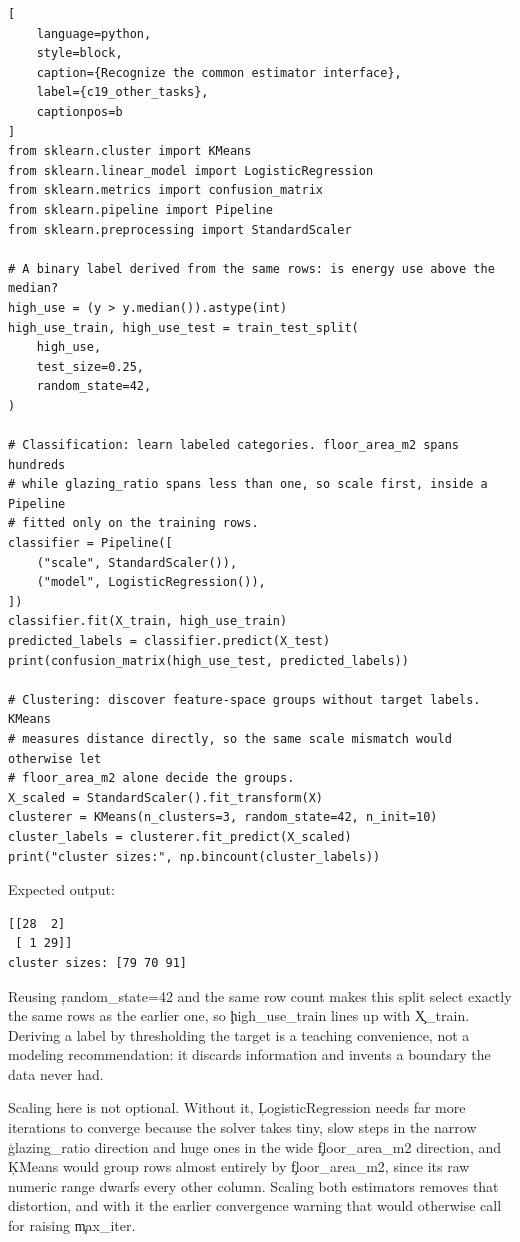 \begin{lstlisting}[
    language=python,
    style=block,
    caption={Recognize the common estimator interface},
    label={c19_other_tasks},
    captionpos=b
]
from sklearn.cluster import KMeans
from sklearn.linear_model import LogisticRegression
from sklearn.metrics import confusion_matrix
from sklearn.pipeline import Pipeline
from sklearn.preprocessing import StandardScaler

# A binary label derived from the same rows: is energy use above the median?
high_use = (y > y.median()).astype(int)
high_use_train, high_use_test = train_test_split(
    high_use,
    test_size=0.25,
    random_state=42,
)

# Classification: learn labeled categories. floor_area_m2 spans hundreds
# while glazing_ratio spans less than one, so scale first, inside a Pipeline
# fitted only on the training rows.
classifier = Pipeline([
    ("scale", StandardScaler()),
    ("model", LogisticRegression()),
])
classifier.fit(X_train, high_use_train)
predicted_labels = classifier.predict(X_test)
print(confusion_matrix(high_use_test, predicted_labels))

# Clustering: discover feature-space groups without target labels. KMeans
# measures distance directly, so the same scale mismatch would otherwise let
# floor_area_m2 alone decide the groups.
X_scaled = StandardScaler().fit_transform(X)
clusterer = KMeans(n_clusters=3, random_state=42, n_init=10)
cluster_labels = clusterer.fit_predict(X_scaled)
print("cluster sizes:", np.bincount(cluster_labels))
\end{lstlisting}

Expected output:

\begin{lstlisting}[language=text, style=block, caption={The same estimator interface, three different tasks}, label={c19_other_tasks_output}, captionpos=b]
[[28  2]
 [ 1 29]]
cluster sizes: [79 70 91]
\end{lstlisting}

Reusing \c{random_state=42} and the same row count makes this split select
exactly the same rows as the earlier one, so \c{high_use_train} lines up with
\c{X_train}. Deriving a label by thresholding the target is a teaching
convenience, not a modeling recommendation: it discards information and invents
a boundary the data never had.

Scaling here is not optional. Without it, \c{LogisticRegression} needs far
more iterations to converge because the solver takes tiny, slow steps in the
narrow \c{glazing_ratio} direction and huge ones in the wide
\c{floor_area_m2} direction, and \c{KMeans} would group rows almost entirely
by \c{floor_area_m2}, since its raw numeric range dwarfs every other column.
Scaling both estimators removes that distortion, and with it the earlier
convergence warning that would otherwise call for raising \c{max_iter}.

